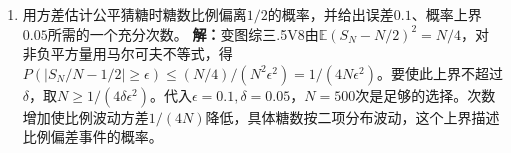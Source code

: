 \documentclass[UTF8,fontset=fandol,a4paper,11pt]{ctexart}
\begin{document}
\begin{enumerate}
\item 用方差估计公平猜糖时糖数比例偏离$1/2$的概率，并给出误差$0.1$、概率上界$0.05$所需的一个充分次数。
\textbf{解：}变图综三.5V8由$\mathbb E(S_N-N/2)^2=N/4$，对非负平方量用马尔可夫不等式，得$P(|S_N/N-1/2|\ge\epsilon)\le(N/4)/(N^2\epsilon^2)=1/(4N\epsilon^2)$。要使此上界不超过$\delta$，取$N\ge1/(4\delta\epsilon^2)$。代入$\epsilon=0.1,\delta=0.05$，$N=500$次是足够的选择。次数增加使比例波动方差$1/(4N)$降低，具体糖数按二项分布波动，这个上界描述比例偏差事件的概率。
\begin{center}\begin{minipage}{.98\linewidth}\centering
{}
\end{minipage}
\end{center}
\end{enumerate}
\end{document}
